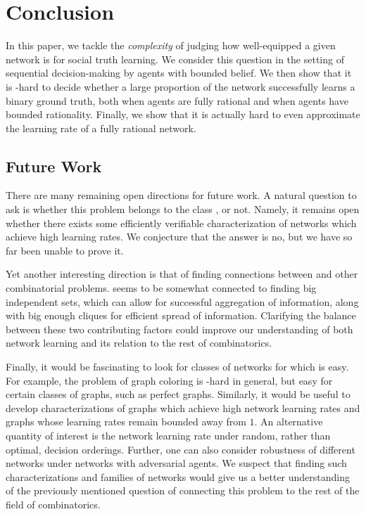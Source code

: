 \section{Conclusion}

In this paper, we tackle the \emph{complexity} of judging how well-equipped a given network is for social truth learning.
We consider this question in the setting of sequential decision-making by agents with bounded belief.
We then show that it is \np-hard to decide whether a large proportion of the network successfully learns a binary ground truth, both when agents are fully rational and when agents have bounded rationality. Finally, we show that it is actually hard to even approximate the learning rate of a fully rational network.

\subsection*{Future Work}

There are many remaining open directions for future work.
A natural question to ask is whether this problem belongs to the class \np, or not. Namely, it remains open whether there exists some efficiently verifiable characterization of networks which achieve high learning rates.
We conjecture that the answer is no, but we have so far been unable to prove it.

Yet another interesting direction is that of finding connections between \netlearn{} and other combinatorial problems.
\netlearn{} seems to be somewhat connected to finding big independent sets, which can allow for successful aggregation of information, along with big enough cliques for efficient spread of information. Clarifying the balance between these two contributing factors could improve our understanding of both network learning and its relation to the rest of combinatorics.

Finally, it would be fascinating to look for classes of networks for which \netlearn{} is easy.
For example, the problem of graph coloring is \np-hard in general, but easy for certain classes of graphs, such as perfect graphs. Similarly, it would be useful to develop characterizations of graphs which achieve high network learning rates and graphs whose learning rates remain bounded away from $1$. An alternative quantity of interest is the network learning rate under random, rather than optimal, decision orderings. Further, one can also consider robustness of different networks under networks with adversarial agents. 
We suspect that finding such characterizations and families of networks would give us a better understanding of the previously mentioned question of connecting this problem to the rest of the field of combinatorics.
